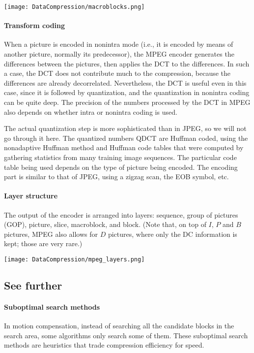 \documentclass[a4paper, 11pt, openany]{book}
\numberwithin{equation}{section}
\theoremstyle{plain}
\theoremstyle{definition}
\begin{document}
\begin{center}
    \texttt{[image: DataCompression/macroblocks.png]}
\end{center}

\paragraph{Transform coding}
When a picture is encoded in nonintra mode (i.e., it is encoded by means of another
picture, normally its predecessor), the MPEG encoder generates the differences between the pictures, then applies the DCT to the differences. In such a case, the DCT does not
contribute much to the compression, because the differences are already decorrelated.
Nevertheless, the DCT is useful even in this case, since it is followed by quantization,
and the quantization in nonintra coding can be quite deep. The precision of the numbers processed by the DCT in MPEG also depends on whether intra or nonintra coding is used.

The actual quantization step is more sophisticated than in JPEG, so we will not go through it here. The quantized numbers QDCT are Huffman coded, using the nonadaptive Huffman method and Huffman code tables that were computed by gathering statistics from many training image sequences. The particular code table being used depends on the type of picture being encoded. The encoding part is similar to that of JPEG, using a zigzag scan, the EOB symbol, etc.


\paragraph{Layer structure}
The output of the encoder is arranged into layers: sequence, group of pictures (GOP), picture, slice, macroblock, and block. (Note that, on top of $I$, $P$ and $B$ pictures, MPEG also allows for $D$ pictures, where only the DC information is kept; those are very rare.)

\begin{center}
    \texttt{[image: DataCompression/mpeg\_layers.png]}
\end{center}


\subsection{See further}

\paragraph{Suboptimal search methods}
In motion compensation, instead of searching all the candidate blocks in the search area, some algorithms only search some of them. These suboptimal search methods are heuristics that trade compression efficiency for speed.
\end{document}
